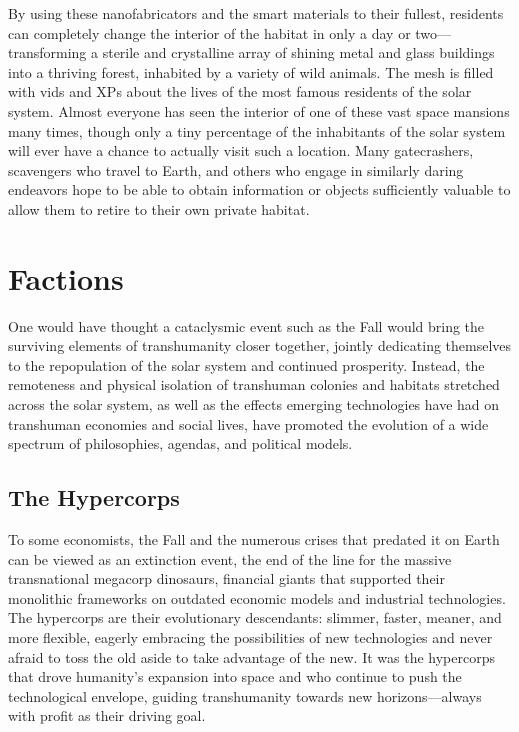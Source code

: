 By using these nanofabricators and the smart materials
to their fullest, residents can completely change
the interior of the habitat in only a day or two—transforming
a sterile and crystalline array of shining metal
and glass buildings into a thriving forest, inhabited by 
a variety of wild animals. The mesh is filled with vids 
and XPs about the lives of the most famous residents 
of the solar system. Almost everyone has seen the interior
of one of these vast space mansions many times,
though only a tiny percentage of the inhabitants of 
the solar system will ever have a chance to actually 
visit such a location. Many gatecrashers, scavengers 
who travel to Earth, and others who engage in similarly
daring endeavors hope to be able to obtain information
or objects sufficiently valuable to allow them
to retire to their own private habitat.

\section{Factions}

One would have thought a cataclysmic event such 
as the Fall would bring the surviving elements of 
transhumanity closer together, jointly dedicating 
themselves to the repopulation of the solar system 
and continued prosperity. Instead, the remoteness and 
physical isolation of transhuman colonies and habitats 
stretched across the solar system, as well as the effects
emerging technologies have had on transhuman
economies and social lives, have promoted the evolution
of a wide spectrum of philosophies, agendas, and
political models.

\subsection{The Hypercorps}

To some economists, the Fall and the numerous crises 
that predated it on Earth can be viewed as an extinction
event, the end of the line for the massive transnational
megacorp dinosaurs, financial giants that
supported their monolithic frameworks on outdated 
economic models and industrial technologies. The hypercorps
are their evolutionary descendants: slimmer,
faster, meaner, and more flexible, eagerly embracing 
the possibilities of new technologies and never afraid 
to toss the old aside to take advantage of the new. It 
was the hypercorps that drove humanity's expansion 
into space and who continue to push the technological 
envelope, guiding transhumanity towards new horizons—always
with profit as their driving goal.

